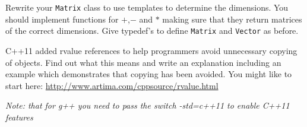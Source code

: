 \documentclass{supervision}
\begin{document}
\begin{questions}

  \question Rewrite your \lstinline|Matrix| class to use templates to determine
    the dimensions. You should implement functions for $+$,$-$ and $*$ making
    sure that they return matrices of the correct dimensions. Give typedef's to
    define \lstinline|Matrix| and \lstinline|Vector| as before.

  \question C++11 added rvalue references to help programmers avoid unnecessary
    copying of objects. Find out what this means and write an explanation
    including an example which demonstrates that copying has been avoided. You
    might like to start here: \url{http://www.artima.com/cppsource/rvalue.html}

    \emph{Note: that for g++ you need to pass the switch -std=c++11 to enable
    C++11 features}

\end{questions}
\end{document}
